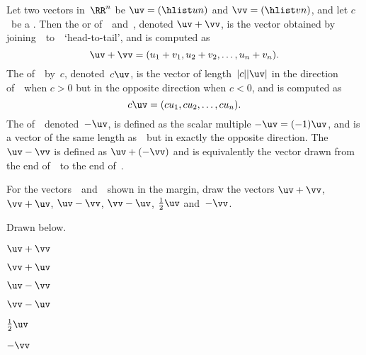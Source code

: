 \begin{definition} \label{def:vecops}
Let two vectors in~\(\RR^n\) be \(\uv=(\hlist un)\) and \(\vv=(\hlist vn)\), and let \(c\)~be a .
Then the  or  of~\uv\ and~\vv, denoted \(\uv+\vv\), is the vector obtained by joining~\vv\ to~\uv\ `head-to-tail', and is computed as
\begin{equation*}
\uv+\vv=(u_1+v_1,u_2+v_2,\ldots,u_n+v_n).
\end{equation*}
The  of~\uv\ by~\(c\), denoted~\(c\uv\),  is the vector of length~\(|c||\uv|\) in the direction of~\uv\ when \(c>0\) but in the opposite direction when \(c<0\), and is computed as
\begin{equation*}
c\uv=(cu_1,cu_2,\ldots,cu_n).
\end{equation*}
The  of~\uv\, denoted~\(-\uv\), is defined as the scalar multiple \(-\uv=(-1)\uv\), and is a vector of the same length as~\uv\ but in exactly the opposite direction.
The  \(\uv-\vv\) is defined as \(\uv+(-\vv)\) and is equivalently the vector drawn from the end of~\vv\ to the end of~\uv.
\end{definition}



\begin{example} \label{eg:}
For the vectors~\uv\ and~\vv\ shown in the margin, draw the vectors
\(\uv+\vv\), \(\vv+\uv\), \(\uv-\vv\), \(\vv-\uv\), \(\tfrac12\uv\) and~\(-\vv\).

\begin{solution} Drawn below.
\begin{parts}
\item $\uv+\vv$ 
\item $\vv+\uv$ 
\item $\uv-\vv$ 
\item $\vv-\uv$ 
\item $\tfrac12\uv$ 
\item $-\vv$ 
\end{parts}
\end{solution}
\end{example}





